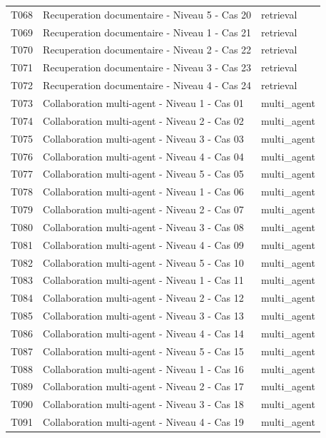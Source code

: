 \begin{longtable}{@{}lll@{}}
T068 & Recuperation documentaire - Niveau 5 - Cas 20 & retrieval \\
T069 & Recuperation documentaire - Niveau 1 - Cas 21 & retrieval \\
T070 & Recuperation documentaire - Niveau 2 - Cas 22 & retrieval \\
T071 & Recuperation documentaire - Niveau 3 - Cas 23 & retrieval \\
T072 & Recuperation documentaire - Niveau 4 - Cas 24 & retrieval \\
T073 & Collaboration multi-agent - Niveau 1 - Cas 01 & multi\_agent \\
T074 & Collaboration multi-agent - Niveau 2 - Cas 02 & multi\_agent \\
T075 & Collaboration multi-agent - Niveau 3 - Cas 03 & multi\_agent \\
T076 & Collaboration multi-agent - Niveau 4 - Cas 04 & multi\_agent \\
T077 & Collaboration multi-agent - Niveau 5 - Cas 05 & multi\_agent \\
T078 & Collaboration multi-agent - Niveau 1 - Cas 06 & multi\_agent \\
T079 & Collaboration multi-agent - Niveau 2 - Cas 07 & multi\_agent \\
T080 & Collaboration multi-agent - Niveau 3 - Cas 08 & multi\_agent \\
T081 & Collaboration multi-agent - Niveau 4 - Cas 09 & multi\_agent \\
T082 & Collaboration multi-agent - Niveau 5 - Cas 10 & multi\_agent \\
T083 & Collaboration multi-agent - Niveau 1 - Cas 11 & multi\_agent \\
T084 & Collaboration multi-agent - Niveau 2 - Cas 12 & multi\_agent \\
T085 & Collaboration multi-agent - Niveau 3 - Cas 13 & multi\_agent \\
T086 & Collaboration multi-agent - Niveau 4 - Cas 14 & multi\_agent \\
T087 & Collaboration multi-agent - Niveau 5 - Cas 15 & multi\_agent \\
T088 & Collaboration multi-agent - Niveau 1 - Cas 16 & multi\_agent \\
T089 & Collaboration multi-agent - Niveau 2 - Cas 17 & multi\_agent \\
T090 & Collaboration multi-agent - Niveau 3 - Cas 18 & multi\_agent \\
T091 & Collaboration multi-agent - Niveau 4 - Cas 19 & multi\_agent \\

\end{longtable}
